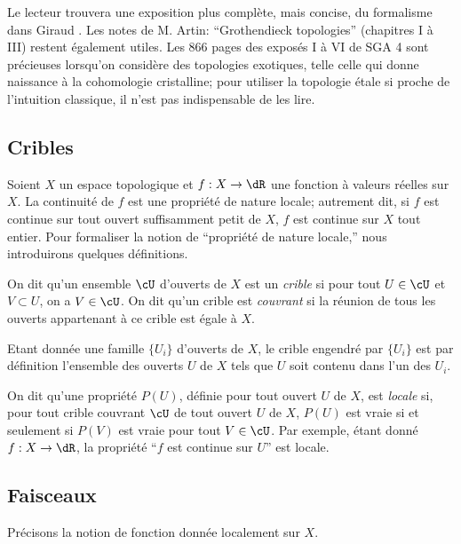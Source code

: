 Le lecteur trouvera une exposition plus complète, mais concise, du 
formalisme dans Giraud . Les notes de M. Artin: ``Grothendieck 
topologies''  (chapitres I à III) restent également utiles. Les 
866 pages des exposés I à VI de SGA 4 sont précieuses lorsqu'on 
considère des topologies exotiques, telle celle qui donne naissance à la 
cohomologie cristalline; pour utiliser la topologie étale si proche de 
l'intuition classique, il n'est pas indispensable de les lire. 










\subsection{Cribles}\label{I:1-1}

Soient $X$ un espace topologique et $f:X\to \dR$ une fonction à valeurs 
réelles sur $X$. La continuité de $f$ est une propriété de nature 
locale; autrement dit, si $f$ est continue sur tout ouvert suffisamment petit 
de $X$, $f$ est continue sur $X$ tout entier. Pour formaliser la notion de 
``propriété de nature locale,'' nous introduirons quelques définitions.

On dit qu'un ensemble $\cU$ d'ouverts de $X$ est un \emph{crible} si pour tout 
$U\in\cU$ et $V\subset U$, on a $V\in\cU$. On dit qu'un crible est 
\emph{couvrant} si la réunion de tous les ouverts appartenant à ce crible est 
égale à $X$.

Etant donnée une famille $\{U_i\}$ d'ouverts de $X$, le crible engendré par 
$\{U_i\}$ est par définition l'ensemble des ouverts $U$ de $X$ tels que $U$ 
soit contenu dans l'un des $U_i$. 

On dit qu'une propriété $P(U)$, définie pour tout ouvert $U$ de $X$, est 
\emph{locale} si, pour tout crible couvrant $\cU$ de tout ouvert $U$ de $X$, 
$P(U)$ est vraie si et seulement si $P(V)$ est vraie pour tout $V\in \cU$. Par 
exemple, étant donné $f:X\to \dR$, la propriété ``$f$ est continue sur $U$'' 
est locale. 





\subsection{Faisceaux}\label{I:1-2}

Précisons la notion de fonction donnée localement sur $X$.





